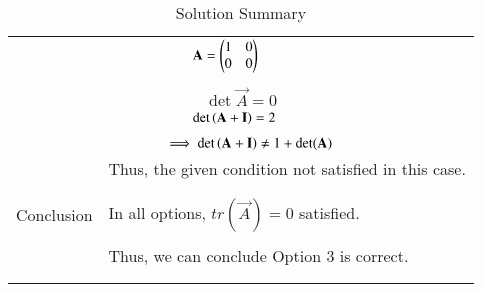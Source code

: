 \documentclass[journal,12pt]{IEEEtran}
\begin{document}
\begin{longtable}{|p{5cm}|p{13cm}|}
    & $\qquad\qquad\qquad\mathbf{A}= \begin{pmatrix}1&0\\0&0\end{pmatrix}$\\
    &\\
    & $\qquad\qquad\qquad\det{\vec{A}}=0$\\
    & $\qquad\qquad\qquad\det\left(\mathbf{A}+\mathbf{I}\right)=2$\\
    &\\
    & $\qquad\qquad\implies\det\left(\mathbf{A}+\mathbf{I}\right)\neq1+\det(\mathbf{A}) $\\
    & Thus, the given condition not satisfied in this case.\\
    &\\
    \hline
	\multirow{3}{*}{Conclusion}&\\
& In all options, $tr(\vec{A})=0$ satisfied.\\
&\\
& Thus, we can conclude Option 3 is correct. \\
&\\
	\hline
	\caption{Solution Summary}
    \label{table:1}
\end{longtable}
\end{document}
